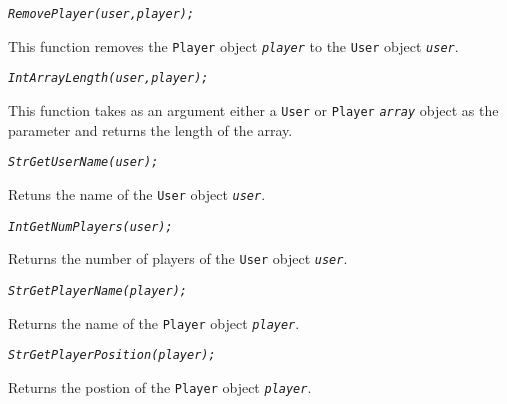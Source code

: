 \documentclass[12pt]{report}
\begin{document}
\begin{alltt}\begin{singlespace}
            \textit{RemovePlayer(user, player);}\end{singlespace}
\end{alltt}

This function removes the \texttt{Player} object \textit{\texttt{player}} to the \texttt{User} object \textit{\texttt{user}}.

\begin{alltt}\begin{singlespace}
            \textit{Int ArrayLength(user, player);}\end{singlespace}
\end{alltt}

This function takes as an argument either a \texttt{User} or \texttt{Player} \textit{\texttt{array}} object as the parameter and returns the length of the array.

\begin{alltt}\begin{singlespace}
            \textit{Str GetUserName(user);}\end{singlespace}
\end{alltt}

Retuns the name of the \texttt{User} object \textit{\texttt{user}}.

\begin{alltt}\begin{singlespace}
            \textit{Int GetNumPlayers(user);}\end{singlespace}
\end{alltt}
     
Returns the number of players of the \texttt{User} object \textit{\texttt{user}}.

\begin{alltt}\begin{singlespace}
            \textit{Str GetPlayerName(player);}\end{singlespace}
\end{alltt}

Returns the name of the \texttt{Player} object \textit{\texttt{player}}.

\begin{alltt}\begin{singlespace}
            \textit{Str GetPlayerPosition(player);}\end{singlespace}
\end{alltt}

Returns the postion of the \texttt{Player} object \textit{\texttt{player}}.
\end{document}
